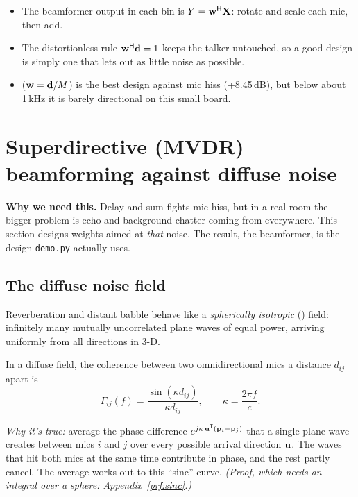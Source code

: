 \documentclass[11pt]{article}
\begin{document}
\begin{takeaways}
\begin{itemize}[nosep]
\item The beamformer output in each bin is $Y=\mathbf{w}^{\mathsf H}\mathbf{X}$: rotate and scale each mic, then add.
\item The distortionless rule $\mathbf{w}^{\mathsf H}\mathbf{d}=1$ keeps the talker untouched, so a good design is
  simply one that lets out as little noise as possible.
\item {} ($\mathbf{w}=\mathbf{d}/M$) is the best design against mic hiss (+8.45\,dB),
  but below about 1\,kHz it is barely directional on this small board.
\end{itemize}
\end{takeaways}

\section{Superdirective (MVDR) beamforming against diffuse noise}\label{sec:sd}

\noindent\textbf{Why we need this.} Delay-and-sum fights mic hiss, but in a real room the bigger
problem is echo and background chatter coming from everywhere. This section designs weights
aimed at \emph{that} noise. The result, the  beamformer, is
the design \texttt{demo.py} actually uses.

\subsection{The diffuse noise field}

Reverberation and distant babble behave like a \emph{spherically isotropic}
() field: infinitely many mutually uncorrelated plane waves of equal
power, arriving uniformly from all directions in 3-D.

\begin{proposition}\label{prop:sinc}
In a diffuse field, the coherence between two omnidirectional mics a distance $d_{ij}$ apart is
\begin{equation}\label{eq:sinc}
  \Gamma_{ij}(f)=\frac{\sin(\kappa d_{ij})}{\kappa d_{ij}},\qquad \kappa=\frac{2\pi f}{c}.
\end{equation}
\end{proposition}
\noindent\emph{Why it's true:} average the phase difference $e^{j\kappa\,\mathbf{u}^{\mathsf T}(\mathbf{p}_i-\mathbf{p}_j)}$
that a single plane wave creates between mics $i$ and $j$ over every possible arrival direction
$\mathbf{u}$. The waves that hit both mics at the same time contribute in phase, and the rest partly
cancel. The average works out to this ``sinc'' curve. \emph{(Proof, which needs an integral over
a sphere: Appendix~\ref{prf:sinc}.)}
\end{document}
